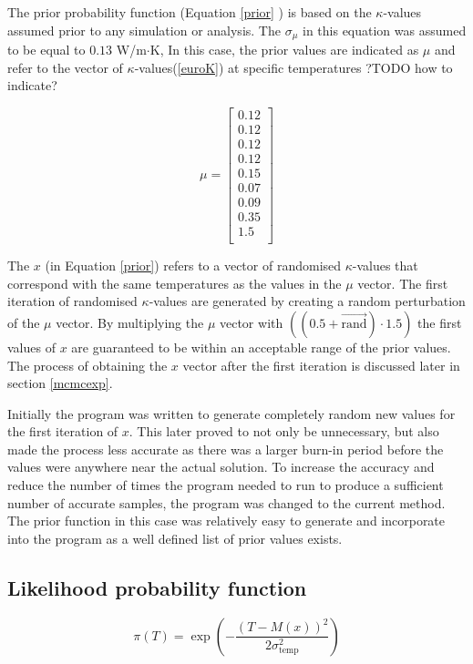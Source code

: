 	The prior probability function (Equation \ref{prior} ) is based on the $\kappa$-values assumed prior to any simulation or analysis. 
	The $\sigma_{\mu}$ in this equation was assumed to be equal to $0.13$ W/m$\cdot$K,
	In this case, the prior values are indicated as $\mu$ and refer to the vector of $\kappa$-values(\ref{euroK}) at specific temperatures ?TODO how to indicate?
	
	\begin{equation}
	\label{euroK}
	\mu =
		\begin{bmatrix}
		0.12\\ 
		0.12\\ 
		0.12\\ 
		0.12\\ 
		0.15\\ 
		0.07\\
		0.09\\ 
		0.35\\ 
		1.5\\
		\end{bmatrix}
	\end{equation}
	
The $x$ (in Equation \ref{prior}) refers to a vector of randomised $\kappa$-values that correspond with the same temperatures as the values in the $\mu$ vector.
The first iteration of randomised $\kappa$-values are generated by creating a random perturbation of the $\mu$ vector.
By multiplying the $\mu$ vector with $((0.5+\vec{\text{rand}})\cdot1.5)$ the first values of $x$ are guaranteed to be within an acceptable range of the prior values.
The process of obtaining the $x$ vector after the first iteration is discussed later in section \ref{mcmcexp}.


Initially the program was written to generate completely random new values for the first iteration of $x$. 
This later proved to not only be unnecessary, but also made the process less accurate as there was a larger burn-in period before the values were anywhere near the actual solution.
To increase the accuracy and reduce the number of times the program needed to run to produce a sufficient number of accurate samples, the program was changed to the current method.
The prior function in this case was relatively easy to generate and incorporate into the program as a well defined list of prior values exists.

	\subsection{Likelihood probability function}
		\begin{equation}
		\label{likelihoodfunc}
		\pi(T) = \exp\left(-\frac{\left(T-M(x)\right)^2}{2\sigma_{\text{temp}}^2}\right)
		\end{equation}
		
